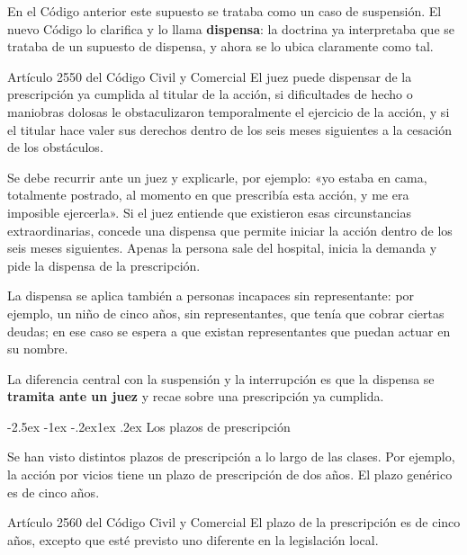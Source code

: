 \documentclass[12pt,oneside]{book}
\makeatletter
\renewcommand\subsection{\@startsection{subsection}{2}{\z@}%
  {-2.5ex \@plus -1ex \@minus -.2ex}{1ex \@plus .2ex}%
  {\normalfont\normalsize\bfseries}}
\makeatother
\begin{document}
En el Código anterior este supuesto se trataba como un caso de suspensión. El nuevo Código lo clarifica y lo llama \textbf{dispensa}: la doctrina ya interpretaba que se trataba de un supuesto de dispensa, y ahora se lo ubica claramente como tal.

\begin{articulo}{Artículo 2550 del Código Civil y Comercial}
El juez puede dispensar de la prescripción ya cumplida al titular de la acción, si dificultades de hecho o maniobras dolosas le obstaculizaron temporalmente el ejercicio de la acción, y si el titular hace valer sus derechos dentro de los seis meses siguientes a la cesación de los obstáculos.
\end{articulo}

\begin{ejemplo}
Se debe recurrir ante un juez y explicarle, por ejemplo: «yo estaba en cama, totalmente postrado, al momento en que prescribía esta acción, y me era imposible ejercerla». Si el juez entiende que existieron esas circunstancias extraordinarias, concede una dispensa que permite iniciar la acción dentro de los seis meses siguientes. Apenas la persona sale del hospital, inicia la demanda y pide la dispensa de la prescripción.
\end{ejemplo}

La dispensa se aplica también a personas incapaces sin representante: por ejemplo, un niño de cinco años, sin representantes, que tenía que cobrar ciertas deudas; en ese caso se espera a que existan representantes que puedan actuar en su nombre.

\begin{importante}
La diferencia central con la suspensión y la interrupción es que la dispensa se \textbf{tramita ante un juez} y recae sobre una prescripción ya cumplida.
\end{importante}

\subsection{Los plazos de prescripción}

Se han visto distintos plazos de prescripción a lo largo de las clases. Por ejemplo, la acción por vicios tiene un plazo de prescripción de dos años. El plazo genérico es de cinco años.

\begin{articulo}{Artículo 2560 del Código Civil y Comercial}
El plazo de la prescripción es de cinco años, excepto que esté previsto uno diferente en la legislación local.
\end{articulo}
\end{document}
